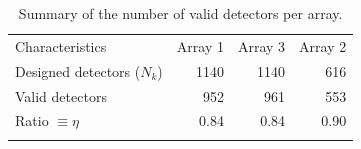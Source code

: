 
\begin{table}[!htbp]
  \begin{center}
    \caption[Number of detectors]{Summary of the number of valid detectors per array.}
    \label{tab:number_of_kids}  
    \begin{tabular}{lrrr}
      \hline
      \hline
      \noalign{\smallskip}
      Characteristics & Array 1 & Array 3  & Array 2  \\
      \noalign{\smallskip}
      \hline
      \noalign{\smallskip}
      Designed detectors ($N_k$)  & 1140  & 1140   & 616  \\
      Valid detectors             & 952   & 961    & 553  \\ 
      Ratio $\equiv \eta$         & 0.84  & 0.84   & 0.90   \\
      \noalign{\smallskip}
      \hline
    \end{tabular}
  \end{center}    
\end{table}

